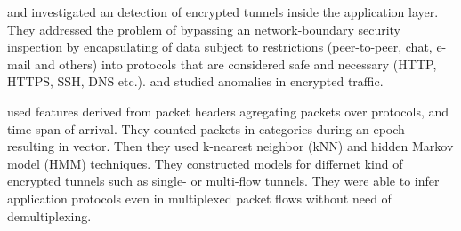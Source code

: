  \cite{wright2006inferring} and  \cite{dusi2009tunnel} 
investigated an detection of encrypted tunnels inside the application layer. 
They addressed the problem of bypassing an network-boundary
security inspection by encapsulating of data subject to restrictions 
(peer-to-peer, chat, e-mail and others) into protocols that are considered safe 
and necessary (HTTP, HTTPS, SSH, DNS etc.). 
 \cite{estevez2004measuring}  and  
\cite{yamada2007intrusion} studied anomalies in encrypted traffic.

 \cite{wright2006inferring} used features derived from packet headers 
agregating packets over protocols, and time span of arrival. They counted packets in 
categories during an epoch
resulting in vector. Then they used k-nearest neighbor (kNN) and hidden Markov model 
(HMM) techniques. They constructed models for differnet kind of encrypted tunnels 
such as single- or multi-flow tunnels. They were able to infer application protocols even in
multiplexed packet flows without need of demultiplexing.




